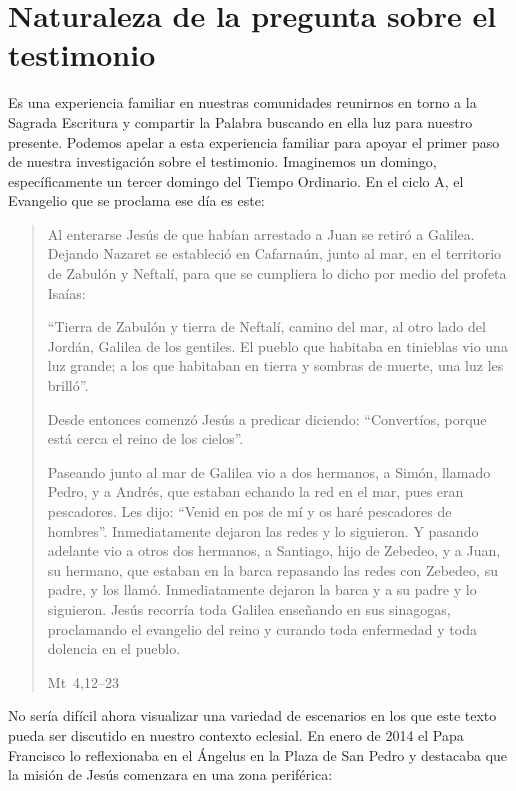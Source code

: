 \section{Naturaleza de la pregunta sobre el testimonio}
Es una experiencia familiar en nuestras comunidades reunirnos en torno a la
Sagrada Escritura y compartir la Palabra buscando en ella luz para nuestro
presente. Podemos apelar a esta experiencia familiar para apoyar el primer paso
de nuestra investigación sobre el testimonio. Imaginemos un domingo,
específicamente un tercer domingo del Tiempo Ordinario. En el ciclo A, el
Evangelio que se proclama ese día es este:
\blockquote[Mt~4,12--23]{Al enterarse Jesús de que habían arrestado a Juan se
  retiró a Galilea. Dejando Nazaret se estableció en Cafarnaún, junto al mar, en
  el territorio de Zabulón y Neftalí, para que se cumpliera lo dicho por medio
  del profeta Isaías:

  \enquote{Tierra de Zabulón y tierra de Neftalí, camino del mar, al otro lado
    del Jordán, Galilea de los gentiles. El pueblo que habitaba en tinieblas vio
    una luz grande; a los que habitaban en tierra y sombras de muerte, una luz
    les brilló}.

  Desde entonces comenzó Jesús a predicar diciendo: \enquote{Convertíos, porque
    está cerca el reino de los cielos}.

  Paseando junto al mar de Galilea vio a dos hermanos, a Simón, llamado Pedro, y
  a Andrés, que estaban echando la red en el mar, pues eran pescadores. Les
  dijo: \enquote{Venid en pos de mí y os haré pescadores de hombres}.
  Inmediatamente dejaron las redes y lo siguieron. Y pasando adelante vio a
  otros dos hermanos, a Santiago, hijo de Zebedeo, y a Juan, su hermano, que
  estaban en la barca repasando las redes con Zebedeo, su padre, y los llamó.
  Inmediatamente dejaron la barca y a su padre y lo siguieron. Jesús recorría
  toda Galilea enseñando en sus sinagogas, proclamando el evangelio del reino y
  curando toda enfermedad y toda dolencia en el pueblo.}

No sería difícil ahora visualizar una variedad de escenarios en los que este
texto pueda ser discutido en nuestro contexto eclesial. En enero de 2014 el Papa
Francisco lo reflexionaba en el Ángelus en la Plaza de San Pedro y destacaba que
la misión de Jesús comenzara en una zona periférica:

